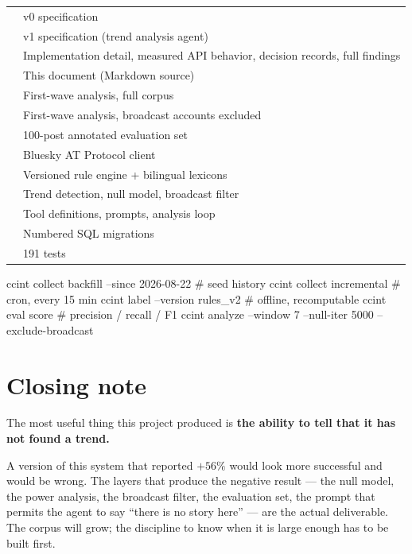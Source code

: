 \documentclass[11pt]{article}
\begin{document}
\noindent
\begin{tabularx}{\textwidth}{@{}>{\raggedright\arraybackslash}p{} L@{}}
\toprule
{} &  \\
\midrule
{} & v0 specification \\
 & v1 specification (trend analysis agent) \\
 & Implementation detail, measured API behavior, decision records, full findings \\
 & This document (Markdown source) \\
 & First-wave analysis, full corpus \\
 & First-wave analysis, broadcast accounts excluded \\
 & 100-post annotated evaluation set \\
 & Bluesky AT Protocol client \\
 & Versioned rule engine + bilingual lexicons \\
 & Trend detection, null model, broadcast filter \\
 & Tool definitions, prompts, analysis loop \\
 & Numbered SQL migrations \\
 & 191 tests \\
\bottomrule
\end{tabularx}

\begin{shell}
ccint collect backfill --since 2026-08-22    # seed history
ccint collect incremental                    # cron, every 15 min
ccint label --version rules_v2               # offline, recomputable
ccint eval score                             # precision / recall / F1
ccint analyze --window 7 --null-iter 5000 --exclude-broadcast
\end{shell}

\section*{Closing note}

\begin{keybox}
The most useful thing this project produced is \textbf{the ability to tell that
it has not found a trend.}
\end{keybox}

A version of this system that reported  $+56\%$ would look
more successful and would be wrong. The layers that produce the negative result
--- the null model, the power analysis, the broadcast filter, the evaluation
set, the prompt that permits the agent to say ``there is no story here'' --- are
the actual deliverable. The corpus will grow; the discipline to know when it is
large enough has to be built first.
\end{document}
